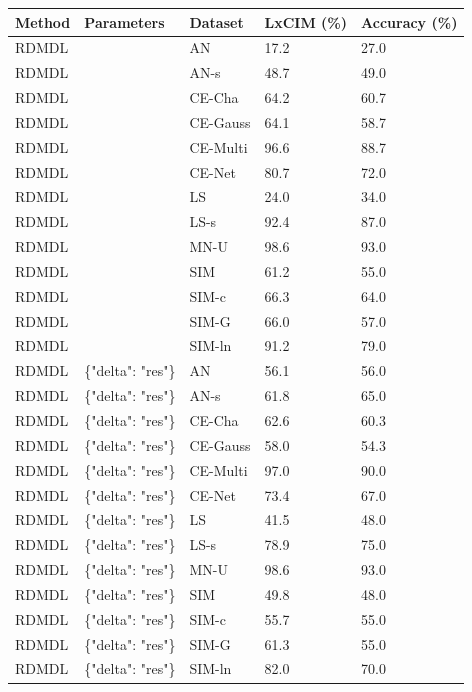 \begin{tabular}{lllll}
\toprule
Method & Parameters & Dataset & LxCIM (\%) & Accuracy (\%) \\
\midrule
RDMDL &  & AN & 17.2 & 27.0 \\
RDMDL &  & AN-s & 48.7 & 49.0 \\
RDMDL &  & CE-Cha & 64.2 & 60.7 \\
RDMDL &  & CE-Gauss & 64.1 & 58.7 \\
RDMDL &  & CE-Multi & 96.6 & 88.7 \\
RDMDL &  & CE-Net & 80.7 & 72.0 \\
RDMDL &  & LS & 24.0 & 34.0 \\
RDMDL &  & LS-s & 92.4 & 87.0 \\
RDMDL &  & MN-U & 98.6 & 93.0 \\
RDMDL &  & SIM & 61.2 & 55.0 \\
RDMDL &  & SIM-c & 66.3 & 64.0 \\
RDMDL &  & SIM-G & 66.0 & 57.0 \\
RDMDL &  & SIM-ln & 91.2 & 79.0 \\
RDMDL & \{"delta": "res"\} & AN & 56.1 & 56.0 \\
RDMDL & \{"delta": "res"\} & AN-s & 61.8 & 65.0 \\
RDMDL & \{"delta": "res"\} & CE-Cha & 62.6 & 60.3 \\
RDMDL & \{"delta": "res"\} & CE-Gauss & 58.0 & 54.3 \\
RDMDL & \{"delta": "res"\} & CE-Multi & 97.0 & 90.0 \\
RDMDL & \{"delta": "res"\} & CE-Net & 73.4 & 67.0 \\
RDMDL & \{"delta": "res"\} & LS & 41.5 & 48.0 \\
RDMDL & \{"delta": "res"\} & LS-s & 78.9 & 75.0 \\
RDMDL & \{"delta": "res"\} & MN-U & 98.6 & 93.0 \\
RDMDL & \{"delta": "res"\} & SIM & 49.8 & 48.0 \\
RDMDL & \{"delta": "res"\} & SIM-c & 55.7 & 55.0 \\
RDMDL & \{"delta": "res"\} & SIM-G & 61.3 & 55.0 \\
RDMDL & \{"delta": "res"\} & SIM-ln & 82.0 & 70.0 \\
\bottomrule
\end{tabular}
